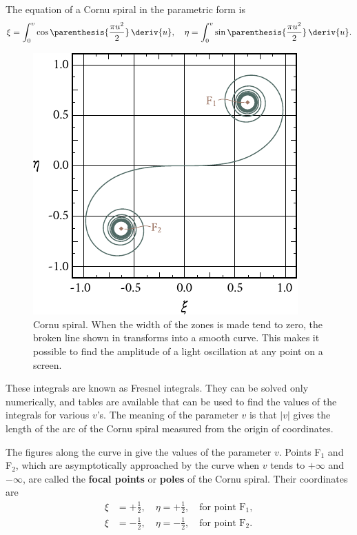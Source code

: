 The equation of a Cornu spiral in the parametric form is
\begin{equation}\label{eq:18_19}
	\xi = \int_0^v \cos\parenthesis{\frac{\pi u^2}{2}}\, \deriv{u}, \quad \eta = \int_0^v \sin\parenthesis{\frac{\pi u^2}{2}}\, \deriv{u}.
\end{equation}

\begin{figure}[t]
	\begin{center}
		\includegraphics[scale=1]{figures/ch_18/fig_18_19.pdf}
        \caption[]{Cornu spiral. When the width of the zones is made tend to zero, the broken line shown in  transforms into a smooth curve. This makes it possible to find the amplitude of a light oscillation at any point on a screen.}
		\label{fig:18_19}
	\end{center}
	\vspace{-0.8cm}
\end{figure}

\noindent
These integrals are known as Fresnel integrals.
They can be solved only numerically, and tables are available that can be used to find the values of the integrals for various $v$'s.
The meaning of the parameter $v$ is that $|v|$ gives the length of the arc of the Cornu spiral measured from the origin of coordinates.

The figures along the curve in  give the values of the parameter $v$.
Points F$_1$ and F$_2$, which are asymptotically approached by the curve when $v$ tends to $+\infty$ and $-\infty$, are called the \textbf{focal points} or \textbf{poles} of the Cornu spiral.
Their coordinates are
\begin{align*}
	\xi &= + \frac{1}{2}, \quad \eta = + \frac{1}{2}, \quad \text{for point F$_1$},\\
	\xi &= - \frac{1}{2}, \quad \eta = - \frac{1}{2}, \quad \text{for point F$_2$}.
\end{align*}

